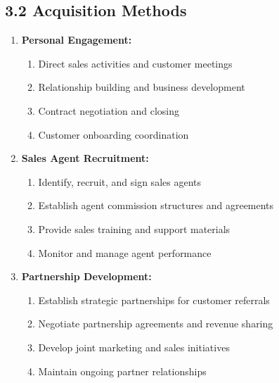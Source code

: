 \subsection*{3.2 Acquisition Methods}
\begin{enumerate}[label=\arabic*.]
\item \textbf{Personal Engagement:}
    \begin{enumerate}[label=(\alph*)]
    \item Direct sales activities and customer meetings
    \item Relationship building and business development
    \item Contract negotiation and closing
    \item Customer onboarding coordination
    \end{enumerate}

\item \textbf{Sales Agent Recruitment:}
    \begin{enumerate}[label=(\alph*)]
    \item Identify, recruit, and sign sales agents
    \item Establish agent commission structures and agreements
    \item Provide sales training and support materials
    \item Monitor and manage agent performance
    \end{enumerate}

\item \textbf{Partnership Development:}
    \begin{enumerate}[label=(\alph*)]
    \item Establish strategic partnerships for customer referrals
    \item Negotiate partnership agreements and revenue sharing
    \item Develop joint marketing and sales initiatives
    \item Maintain ongoing partner relationships
    \end{enumerate}
\end{enumerate}

